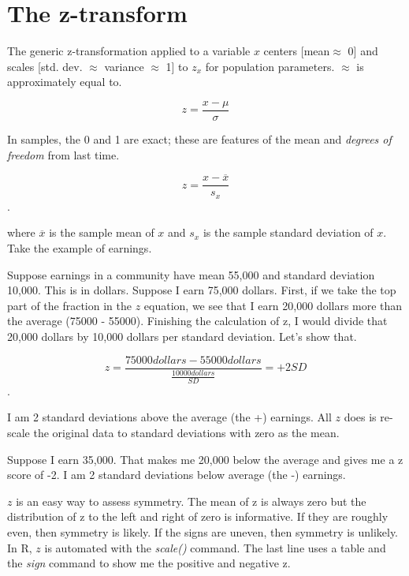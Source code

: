 \documentclass[ignorenonframetext,]{beamer}
\begin{document}
\hypertarget{the-z-transform}{%
\section{The z-transform}\label{the-z-transform}}

The generic z-transformation applied to a variable \(x\) centers
{[}mean\(\approx\) 0{]} and scales {[}std. dev. \(\approx\) variance
\(\approx\) 1{]} to \(z_{x}\) for population parameters. \(\approx\) is
approximately equal to.

\[ z = \frac{x - \mu}{\sigma} \]

\begin{frame}

In samples, the 0 and 1 are exact; these are features of the mean and
\emph{degrees of freedom} from last time.

\[ z = \frac{x - \overline{x}}{s_{x}} \].

where \(\overline{x}\) is the sample mean of \(x\) and \(s_{x}\) is the
sample standard deviation of \(x\). Take the example of earnings.

\end{frame}

\begin{frame}

Suppose earnings in a community have mean 55,000 and standard deviation
10,000. This is in dollars. Suppose I earn 75,000 dollars. First, if we
take the top part of the fraction in the \(z\) equation, we see that I
earn 20,000 dollars more than the average (75000 - 55000). Finishing the
calculation of z, I would divide that 20,000 dollars by 10,000 dollars
per standard deviation. Let's show that.

\[ z = \frac{75000 dollars - 55000 dollars}{\frac{10000 dollars}{SD}} = +2 SD \].

I am 2 standard deviations above the average (the +) earnings. All \(z\)
does is re-scale the original data to standard deviations with zero as
the mean.

\end{frame}

\begin{frame}

Suppose I earn 35,000. That makes me 20,000 below the average and gives
me a z score of -2. I am 2 standard deviations below average (the -)
earnings.

\(z\) is an easy way to assess symmetry. The mean of z is always zero
but the distribution of z to the left and right of zero is informative.
If they are roughly even, then symmetry is likely. If the signs are
uneven, then symmetry is unlikely. In R, \(z\) is automated with the
\emph{scale()} command. The last line uses a table and the \emph{sign}
command to show me the positive and negative z.

\end{frame}
\end{document}
